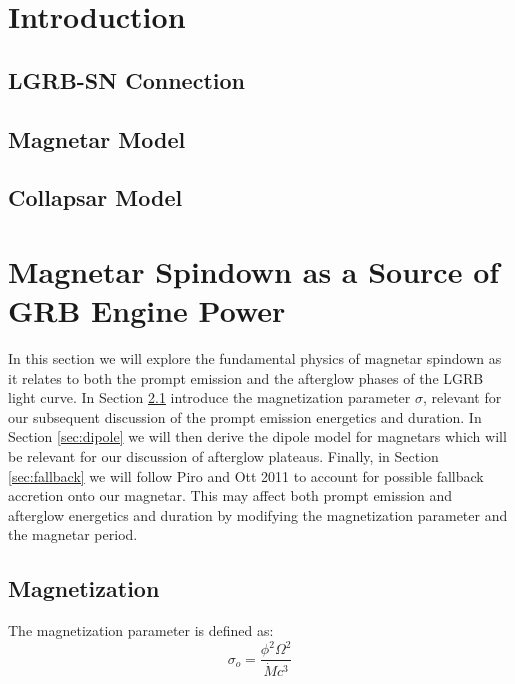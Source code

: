 \documentclass{article}
\begin{document}
\section{Introduction}

\subsection{LGRB-SN Connection}

\subsection{Magnetar Model}

\subsection{Collapsar Model}

\section{Magnetar Spindown as a Source of GRB Engine Power}
In this section we will explore the fundamental physics of magnetar spindown as it relates to both the prompt emission and the afterglow phases of the LGRB light curve. In Section \ref{sec:magnetization} introduce the magnetization parameter $\sigma$, relevant for our subsequent discussion of the prompt emission energetics and duration. In Section \ref{sec:dipole} we will then derive the dipole model for magnetars which will be relevant for our discussion of afterglow plateaus. Finally, in Section \ref{sec:fallback} we will follow Piro and Ott 2011 \cite{Piro:2011ed} to account for possible fallback accretion onto our magnetar. This may affect both prompt emission and afterglow energetics and duration by modifying the magnetization parameter and the magnetar period.

\subsection{Magnetization} \label{sec:magnetization}

The magnetization parameter is defined as: 
\begin{equation}
\sigma_o= \frac{\phi^2 \Omega^2}{\dot{M} c^3}
\end{equation}
\end{document}
